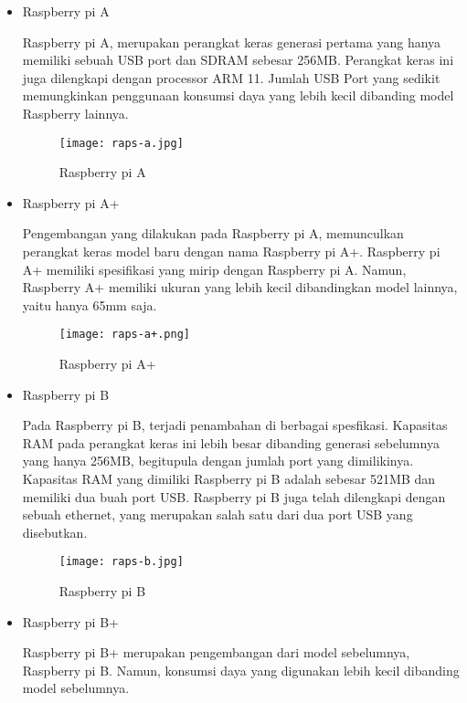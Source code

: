 \begin{itemize}
    \item Raspberry pi A
    
    Raspberry pi A, merupakan perangkat keras generasi pertama yang hanya memiliki sebuah USB port dan SDRAM sebesar 256MB. Perangkat keras ini juga dilengkapi dengan processor ARM 11. Jumlah USB Port yang sedikit memungkinkan penggunaan konsumsi daya yang lebih kecil dibanding model Raspberry lainnya.
    
    \begin{figure}[H]
    	\centering  
    	\texttt{[image: raps-a.jpg]}  
    	\caption[Raspberry pi A]{Raspberry pi A} 
    	\label{fig:Raspberry pi A} 
    \end{figure}
    
    \item Raspberry pi A+
    
    Pengembangan yang dilakukan pada Raspberry pi A, memunculkan perangkat keras model baru dengan nama Raspberry pi A+. Raspberry pi A+ memiliki spesifikasi yang mirip dengan Raspberry pi A. Namun, Raspberry A+ memiliki ukuran yang lebih kecil dibandingkan model lainnya, yaitu hanya 65mm saja.
    
    \begin{figure}[H]
    	\centering  
    	\texttt{[image: raps-a+.png]}  
    	\caption[Raspberry pi A+]{Raspberry pi A+} 
    	\label{fig:Raspberry pi A+} 
    \end{figure}
     
    \item Raspberry pi B
    
    Pada Raspberry pi B, terjadi penambahan di berbagai spesfikasi. Kapasitas RAM pada perangkat keras ini lebih besar dibanding generasi sebelumnya yang hanya 256MB, begitupula dengan jumlah port yang dimilikinya. Kapasitas RAM yang dimiliki Raspberry pi B adalah sebesar 521MB dan memiliki dua buah port USB. Raspberry pi B juga telah dilengkapi dengan sebuah ethernet, yang merupakan salah satu dari dua port USB yang disebutkan.
    
    \begin{figure}[H]
    	\centering  
    	\texttt{[image: raps-b.jpg]}  
    	\caption[Raspberry pi B]{Raspberry pi B} 
    	\label{fig:Raspberry pi B} 
    \end{figure}
    
    \item Raspberry pi B+
    
     Raspberry pi B+ merupakan pengembangan dari model sebelumnya, Raspberry pi B. Namun, konsumsi daya yang digunakan lebih kecil dibanding model sebelumnya.
     

\end{itemize}
